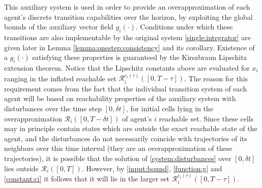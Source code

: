 \documentclass[reqno]{amsart}
\theoremstyle{plain}
\theoremstyle{definition}
\numberwithin{equation}{section}
\begin{document}
\noindent This auxiliary system is used in order to provide an overapproximation of each agent's discrete transition capabilities over the horizon, by exploiting the global bounds of the auxiliary vector field $g_i(\cdot)$. Conditions under which these transitions are also implementable by the original system \eqref{single:integrator} are given later in Lemma \ref{lemma:onestep:consistency} and its corollary. Existence of a $g_i(\cdot)$ satisfying these properties is guaranteed by the Kirszbraun Lipschitz extension theorem. Notice that the Lipschitz constants above are evaluated for $x_i$ ranging in the inflated reachable set ${\ensuremath{\mathcal{R}}}_i^{c_i(\tau)}([0,T-\tau])$. The reason for this requirement comes from the fact that the individual transition system of each agent will be based on reachability properties of the auxiliary system with disturbances over the time step $[0,\delta t]$, for initial cells lying in the overapproximation ${\ensuremath{\mathcal{R}}}_i([0,T-\delta t])$ of agent's $i$ reachable set. Since these cells may in principle contain states which are outside the exact reachable state of the agent, and the disturbances do not necessarily coincide with trajectories of its neighbors over this time interval (they are an overapproximation of these trajectories), it is possible that the solution of \eqref{system:disturbances} over $[0,\delta t]$ lies outside ${\ensuremath{\mathcal{R}}}_i([0,T])$. However, by \eqref{input:bound}, \eqref{function:g} and \eqref{constant:ci} it follows that it will lie in the larger set ${\ensuremath{\mathcal{R}}}_i^{c_i(\tau)}([0,T-\tau])$.   
\end{document}
